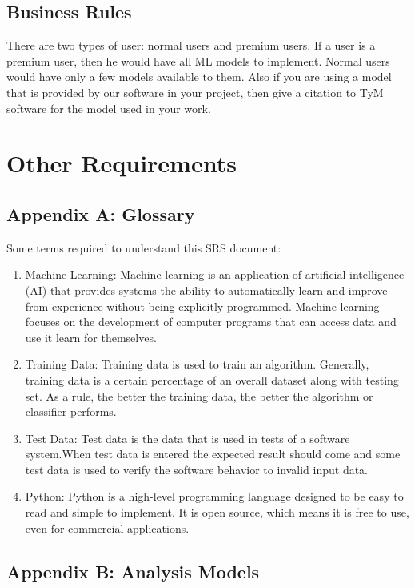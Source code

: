 \documentclass{scrreprt}
\begin{document}
\section{Business Rules}
There are two types of user: normal users and premium users. If a user is a premium user, then he would have all ML models to implement. Normal users would have only a few models available to them. Also if you are using a model that is provided by our software in your project, then give a citation to TyM software for the model used in your work.


\chapter{Other Requirements}

\section{Appendix A: Glossary}
Some terms required to understand this SRS document: 
\begin{enumerate}
\item Machine Learning: Machine learning is an application of artificial intelligence (AI) that provides systems the ability to automatically learn and improve from experience without being explicitly programmed. Machine learning focuses on the development of computer programs that can access data and use it learn for themselves.
\item Training Data: Training data is used to train an algorithm. Generally, training data is a certain percentage of an overall dataset along with testing set. As a rule, the better the training data, the better the algorithm or classifier performs.
\item Test Data: Test data is the data that is used in tests of a software system.When test data is entered the expected result should come and some test data is used to verify the software behavior to invalid input data.
\item Python: Python is a high-level programming language designed to be easy to read and simple to implement. It is open source, which means it is free to use, even for commercial applications.
\end{enumerate}

\section{Appendix B: Analysis Models}
\end{document}
